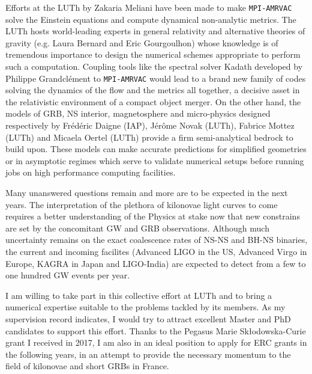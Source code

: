 \documentclass[12pt,onecolumn]{article}
\makeatletter
\newcommand{\gw}{GW\xspace}
\newcommand{\grb}{GRB\xspace}
\newcommand{\grbs}{GRBs\xspace}
\newcommand*{\ns}{NS\@\xspace}
\newcommand*{\bh}{BH\@\xspace}
\newcommand*{\eg}{e.g.\@\xspace}
\makeatother
\begin{document}
Efforts at the LUTh by Zakaria Meliani have been made to make \texttt{MPI-AMRVAC} solve the Einstein equations and compute dynamical non-analytic metrics. The LUTh hosts world-leading experts in general relativity and alternative theories of gravity (\eg Laura Bernard and Eric Gourgoulhon) whose knowledge is of tremendous importance to design the numerical schemes appropriate to perform such a computation. Coupling tools like the spectral solver Kadath developed by Philippe Grandcl\'{e}ment to \texttt{MPI-AMRVAC} would lead to a brand new family of codes solving the dynamics of the flow and the metrics all together, a decisive asset in the relativistic environment of a compact object merger. On the other hand, the models of \grb, \ns interior, magnetosphere and micro-physics designed respectively by Fr\'{e}d\'{e}ric Daigne (IAP), J\'{e}r\^{o}me Novak (LUTh), Fabrice Mottez (LUTh) and Micaela Oertel (LUTh) provide a firm semi-analytical bedrock to build upon. These models can make accurate predictions for simplified geometries or in asymptotic regimes which serve to validate numerical setups before running jobs on high performance computing facilities.

\newpage

Many unanswered questions remain and more are to be expected in the next years. The interpretation of the plethora of kilonovae light curves to come requires a better understanding of the Physics at stake now that new constrains are set by the concomitant \gw and \grb observations. Although much uncertainty remains on the exact coalescence rates of \ns-\ns and \bh-\ns binaries, the current and incoming facilites (Advanced LIGO in the US, Advanced Virgo in Europe, KAGRA in Japan and LIGO-India) are expected to detect from a few to one hundred \gw events per year. 

I am willing to take part in this collective effort at LUTh and to bring a numerical expertise suitable to the problems tackled by its members. As my supervision record indicates, I would try to attract excellent Master and PhD candidates to support this effort. Thanks to the Pegasus Marie Sk\l{}odowska-Curie grant I received in 2017, I am also in an ideal position to apply for ERC grants in the following years, in an attempt to provide the necessary momentum to the field of kilonovae and short \grbs in France.




\vspace*{0.9cm}
\setlength\bibitemsep{0pt}
%
%

%
\printbibliography[heading=none,title={},omitnumbers=true]
\end{document}
